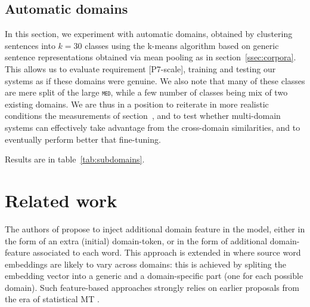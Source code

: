 \documentclass[11pt]{article}
\newcommand{\fyTodo}[1]{\Todo[FY:]{\textcolor{orange}{#1}}}
\newcommand{\domain}[1]{\texttt{\textsc{#1}}}
\begin{document}
\subsection{Automatic domains \label{ssec:autodomains}}
In this section, we experiment with automatic domains, obtained by clustering sentences into $k=30$ classes using the k-means algorithm based on generic sentence representations obtained via mean pooling as in section~\ref{ssec:corpora}. This allows us to evaluate requirement [P7-scale], training and testing our systems as if these domains were genuine. We also note that many of these classes are mere split of the large \domain{med}, while a few number of classes being mix of two existing domains. We are thus in a position to reiterate in more realistic conditions the measurements of section~\label{ssec:}, and to test whether multi-domain systems can effectively take advantage from the cross-domain similarities, and to eventually perform better that fine-tuning.

Results are in table~\ref{tab:subdomains}.\fyTodo{Fill the table}

\section{Related work \label{sec:related}}

The authors of \cite{Kobus17domaincontrol} propose to inject additional domain feature in the model, either in the form of an extra (initial) domain-token, or in the form of additional domain-feature associated to each word. This approach is extended in \cite{Pham19generic} where source word embeddings are likely to vary across domains: this is achieved by spliting the embedding vector into a generic and a domain-specific part (one for each possible domain). Such feature-based approaches strongly relies on earlier proposals from the era of statistical MT \cite{Daume07frustratingly,Clark12onesystem}.
\end{document}
